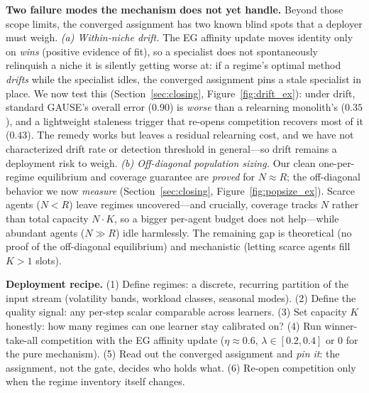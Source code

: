 \documentclass[10pt]{article}
\begin{document}
\noindent\textbf{Two failure modes the mechanism does not yet handle.} Beyond
those scope limits, the converged assignment has two known blind spots that a
deployer must weigh. \emph{(a) Within-niche drift.} The EG affinity update moves
identity only on \emph{wins} (positive evidence of fit), so a specialist does not
spontaneously relinquish a niche it is silently getting worse at: if a regime's optimal
method \emph{drifts} while the specialist idles, the converged assignment pins a stale
specialist in place. We now test this (Section~\ref{sec:closing},
Figure~\ref{fig:drift_ex}): under drift, standard GAUSE's overall error ($0.90$) is
\emph{worse} than a relearning monolith's ($0.35$), and a lightweight staleness trigger
that re-opens competition recovers most of it ($0.43$). The remedy works but leaves a
residual relearning cost, and we have not characterized drift rate or detection
threshold in general---so drift remains a deployment risk to weigh. \emph{(b)
Off-diagonal population sizing.} Our clean one-per-regime equilibrium and coverage
guarantee are \emph{proved} for $N \approx R$; the off-diagonal behavior we now
\emph{measure} (Section~\ref{sec:closing}, Figure~\ref{fig:popsize_ex}). Scarce agents
($N<R$) leave regimes uncovered---and crucially, coverage tracks $N$ rather than total
capacity $N\!\cdot\!K$, so a bigger per-agent budget does not help---while abundant
agents ($N\gg R$) idle harmlessly. The remaining gap is theoretical (no proof of the
off-diagonal equilibrium) and mechanistic (letting scarce agents fill $K>1$ slots).

\begin{designbox}
\textbf{Deployment recipe.} (1) Define regimes: a discrete, recurring
partition of the input stream (volatility bands, workload classes, seasonal
modes). (2) Define the quality signal: any per-step scalar comparable across
learners. (3) Set capacity $K$ honestly: how many regimes can one learner
stay calibrated on? (4) Run winner-take-all competition with the EG affinity
update ($\eta \approx 0.6$, $\lambda \in [0.2, 0.4]$ or $0$ for the pure
mechanism). (5) Read out the converged assignment and \emph{pin it}: the
assignment, not the gate, decides who holds what. (6) Re-open competition only
when the regime inventory itself changes.
\end{designbox}
\end{document}
